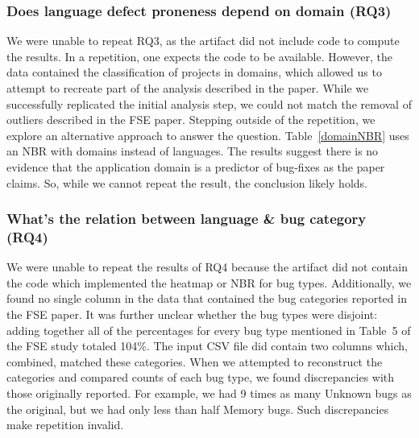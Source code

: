 \documentclass[acmsmall]{acmart}
\begin{document}
\subsubsection{Does language defect proneness depend on domain (RQ3)}

We were unable to repeat RQ3, as the artifact did not include code to
compute the results. 
In a repetition, one expects the code to be available.
However, the data contained the classification of
projects in domains, which allowed us to attempt to recreate part of the
analysis described in the paper.  While we successfully replicated the
initial analysis step, we could not match the removal of outliers described
in the FSE paper.  Stepping outside of the repetition, we explore an
alternative approach to answer the question.  Table~\ref{domainNBR} uses an
NBR with domains instead of languages. The results suggest there is no
evidence that the application domain is a predictor of bug-fixes as the
paper claims.  So, while we cannot repeat the result, the conclusion
likely holds.


\subsubsection{ What's the relation between language \& bug category (RQ4)}

We were unable to repeat the results of RQ4 because the artifact did not
contain the code which implemented the heatmap or NBR for bug
types. Additionally, we found no single column in the data that contained
the bug categories reported in the FSE paper. It was further unclear whether
the bug types were disjoint: adding together all of the percentages for
every bug type mentioned in Table~5 of the FSE study totaled 104\%.  The
input CSV file did contain two columns which, combined, matched these
categories. When we attempted to reconstruct the categories and compared
counts of each bug type, we found discrepancies with those originally
reported.  For example, we had 9 times as many Unknown bugs as the original,
but we had only less than half Memory bugs.  Such discrepancies make
repetition invalid.
\end{document}
